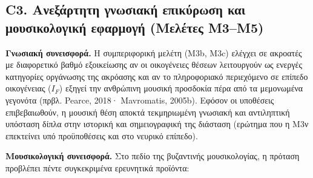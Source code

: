 \documentclass[11pt,a4paper]{article}
\begin{document}
\subsection{C3. Ανεξάρτητη γνωσιακή επικύρωση και μουσικολογική εφαρμογή (Μελέτες Μ3--Μ5)}\label{c3.-ux3b1ux3bdux3b5ux3beux3acux3c1ux3c4ux3b7ux3c4ux3b7-ux3b3ux3bdux3c9ux3c3ux3b9ux3b1ux3baux3ae-ux3b5ux3c0ux3b9ux3baux3cdux3c1ux3c9ux3c3ux3b7-ux3baux3b1ux3b9-ux3bcux3bfux3c5ux3c3ux3b9ux3baux3bfux3bbux3bfux3b3ux3b9ux3baux3ae-ux3b5ux3c6ux3b1ux3c1ux3bcux3bfux3b3ux3ae-ux3bcux3b5ux3bbux3adux3c4ux3b5ux3c2-ux3bc3ux3bc5}

\textbf{Γνωσιακή συνεισφορά.} Η συμπεριφορική μελέτη (Μ3b, Μ3c) ελέγχει σε ακροατές με διαφορετικό βαθμό εξοικείωσης αν οι οικογένειες θέσεων λειτουργούν ως ενεργές κατηγορίες οργάνωσης της ακρόασης και αν το πληροφοριακό περιεχόμενο σε επίπεδο οικογένειας (\(I_F\)) εξηγεί την ανθρώπινη μουσική προσδοκία πέρα από τα μεμονωμένα γεγονότα (πρβλ. Pearce, 2018· Mavromatis, 2005b). Εφόσον οι υποθέσεις επιβεβαιωθούν, η μουσική θέση αποκτά τεκμηριωμένη γνωσιακή και αντιληπτική υπόσταση δίπλα στην ιστορική και σημειογραφική της διάσταση (ερώτημα που η Μ3ν επεκτείνει υπό προϋποθέσεις και στο νευρικό επίπεδο).

\textbf{Μουσικολογική συνεισφορά.} Στο πεδίο της βυζαντινής μουσικολογίας, η πρόταση προβλέπει πέντε συγκεκριμένα ερευνητικά προϊόντα:
\end{document}
